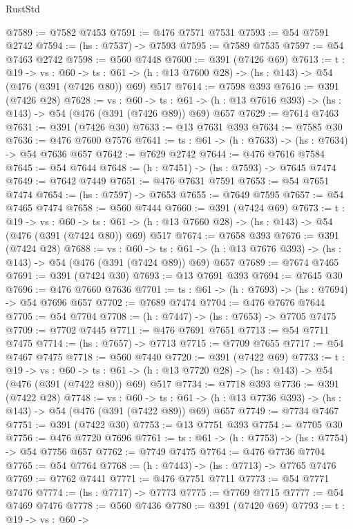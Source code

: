 \begin{lexlean}{RustStd}
\begin{coremodule}
@7589 := @7582 @7453
@7591 := @476 @7571 @7531
@7593 := @54 @7591 @2742
@7594 := (hs : @7537) -> @7593
@7595 := @7589 @7535
@7597 := @54 @7463 @2742
@7598 := @560 @7448
@7600 := @391 (@7426 @69)
@7613 := {t : @19} ->
  {vs : @60} ->
  {ts : @61} -> (h : @13 @7600 @28) -> (hs : @143) -> @54 (@476 (@391 (@7426 @80)) @69) @517
@7614 := @7598 @393
@7616 := @391 (@7426 @28)
@7628 := {vs : @60} ->
  {ts : @61} -> (h : @13 @7616 @393) -> (hs : @143) -> @54 (@476 (@391 (@7426 @89)) @69) @657
@7629 := @7614 @7463
@7631 := @391 (@7426 @30)
@7633 := @13 @7631 @393
@7634 := @7585 @30
@7636 := @476 @7600 @7576
@7641 := {ts : @61} -> (h : @7633) -> (hs : @7634) -> @54 @7636 @657
@7642 := @7629 @2742
@7644 := @476 @7616 @7584
@7645 := @54 @7644
@7648 := (h : @7451) -> (hs : @7593) -> @7645 @7474
@7649 := @7642 @7449
@7651 := @476 @7631 @7591
@7653 := @54 @7651 @7474
@7654 := (hs : @7597) -> @7653
@7655 := @7649 @7595
@7657 := @54 @7465 @7474
@7658 := @560 @7444
@7660 := @391 (@7424 @69)
@7673 := {t : @19} ->
  {vs : @60} ->
  {ts : @61} -> (h : @13 @7660 @28) -> (hs : @143) -> @54 (@476 (@391 (@7424 @80)) @69) @517
@7674 := @7658 @393
@7676 := @391 (@7424 @28)
@7688 := {vs : @60} ->
  {ts : @61} -> (h : @13 @7676 @393) -> (hs : @143) -> @54 (@476 (@391 (@7424 @89)) @69) @657
@7689 := @7674 @7465
@7691 := @391 (@7424 @30)
@7693 := @13 @7691 @393
@7694 := @7645 @30
@7696 := @476 @7660 @7636
@7701 := {ts : @61} -> (h : @7693) -> (hs : @7694) -> @54 @7696 @657
@7702 := @7689 @7474
@7704 := @476 @7676 @7644
@7705 := @54 @7704
@7708 := (h : @7447) -> (hs : @7653) -> @7705 @7475
@7709 := @7702 @7445
@7711 := @476 @7691 @7651
@7713 := @54 @7711 @7475
@7714 := (hs : @7657) -> @7713
@7715 := @7709 @7655
@7717 := @54 @7467 @7475
@7718 := @560 @7440
@7720 := @391 (@7422 @69)
@7733 := {t : @19} ->
  {vs : @60} ->
  {ts : @61} -> (h : @13 @7720 @28) -> (hs : @143) -> @54 (@476 (@391 (@7422 @80)) @69) @517
@7734 := @7718 @393
@7736 := @391 (@7422 @28)
@7748 := {vs : @60} ->
  {ts : @61} -> (h : @13 @7736 @393) -> (hs : @143) -> @54 (@476 (@391 (@7422 @89)) @69) @657
@7749 := @7734 @7467
@7751 := @391 (@7422 @30)
@7753 := @13 @7751 @393
@7754 := @7705 @30
@7756 := @476 @7720 @7696
@7761 := {ts : @61} -> (h : @7753) -> (hs : @7754) -> @54 @7756 @657
@7762 := @7749 @7475
@7764 := @476 @7736 @7704
@7765 := @54 @7764
@7768 := (h : @7443) -> (hs : @7713) -> @7765 @7476
@7769 := @7762 @7441
@7771 := @476 @7751 @7711
@7773 := @54 @7771 @7476
@7774 := (hs : @7717) -> @7773
@7775 := @7769 @7715
@7777 := @54 @7469 @7476
@7778 := @560 @7436
@7780 := @391 (@7420 @69)
@7793 := {t : @19} ->
  {vs : @60} ->

\end{coremodule}
\end{lexlean}
